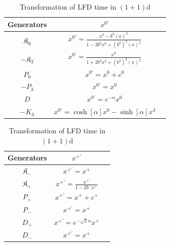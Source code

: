 \documentclass[%
 reprint,
superscriptaddress,
 amsmath,amssymb,
 aps,
]{revtex4-2}
\begin{document}
\begin{widetext}
\begin{center}
\begin{table}[!htb]
        \begin{minipage}{.5\linewidth}
        \begin{tabular}{|c||c|c|}
        \hline
             \rule{0pt}{16pt} Generators & $x^{{0}\prime}$\\
             \hline
             \hline
            \rule{0pt}{16pt} $\mathfrak{K}_{{0}}$ & $x^{{0}\prime}=\frac{x^{{0}}-b^{{0}}(x)^2}{1-2b^{{0}}x^{{0}}+(b^{{0}})^2(x)^2}$\\
             \hline
            \rule{0pt}{16pt} $-\mathfrak{K}_{{3}}$ & $x^{{0}\prime}=\frac{x^{{0}}}{1+2b^{{3}}x^{{3}}+(b^{{3}})^2(x)^2}$ \\
             \hline
             \rule{0pt}{16pt} $P_{{0}}$& $x^{{0}\prime}=x^{{0}}+c^{{0}} $\\
             \hline
             \rule{0pt}{16pt} $-P_{{3}}$& $x^{{0}\prime}=x^{{0}}$  \\
             \hline
             \rule{0pt}{16pt} $D$ & $x^{{0}\prime} = e^{-\alpha}x^{0}$ \\
             \hline
             \rule{0pt}{16pt} $-K_{3}$ & $x^{{0}\prime} = \cosh[\alpha]x^{0}-\sinh[\alpha] x^{3}$ \\
             \hline
        \end{tabular}
        \caption{Transformation of the IFD time in $(1+1)$d}
        \label{tablex0prime}
        \end{minipage}%
    \begin{minipage}{.5\linewidth}
        \begin{tabular}{|c||c|c|}
        \hline
             \rule{0pt}{16pt} Generators & $x^{{+}\prime}$\\
             \hline
             \hline
            \rule{0pt}{16pt} $\mathfrak{K}_{{-}}$ & $x^{{+}\prime}=x^{+}$\\
             \hline
            \rule{0pt}{16pt} $\mathfrak{K}_{{+}}$ & $x^{{+}\prime}=\frac{x^{{+}}}{1-2b^{{-}}x^{{+}}}$ \\
             \hline
             \rule{0pt}{16pt} $P_{{+}}$& $x^{{+}\prime}=x^{{+}}+c^{{+}} $\\
             \hline
             \rule{0pt}{16pt} $P_{{-}}$& $x^{{+}\prime}=x^{{+}}$  \\
             \hline
             \rule{0pt}{16pt} $D_{{+}}$ & $x^{{+}\prime} = e^{-\sqrt{2}\alpha}x^{{+}}$ \\
             \hline
             \rule{0pt}{16pt} $D_{{-}}$ & $x^{{+}\prime} = x^{{+}}$ \\
             \hline
        \end{tabular}
        \caption{Transformation of LFD time in $(1+1)$d}
        \label{tablexplusprime}
          \end{minipage} 
    \end{table}
    \end{center}




\end{widetext}
\end{document}
